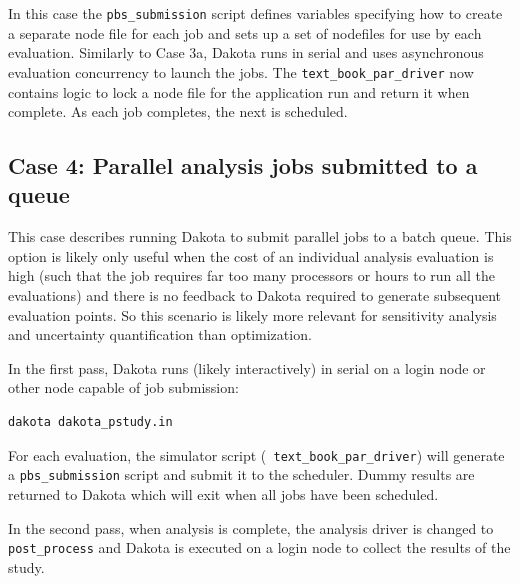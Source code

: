 In this case the {\tt pbs\_submission} script defines variables
specifying how to create a separate node file for each job and sets up
a set of nodefiles for use by each evaluation. Similarly to Case 3a,
Dakota runs in serial and uses asynchronous evaluation concurrency to
launch the jobs.  The {\tt text\_book\_par\_driver} now contains logic
to lock a node file for the application run and return it when
complete.  As each job completes, the next is scheduled.

\subsection{Case 4: Parallel analysis jobs submitted to a queue}

This case describes running Dakota to submit parallel jobs to a batch
queue.  This option is likely only useful when the cost of an
individual analysis evaluation is high (such that the job requires far
too many processors or hours to run all the evaluations) and there is
no feedback to Dakota required to generate subsequent evaluation
points.  So this scenario is likely more relevant for sensitivity
analysis and uncertainty quantification than optimization.

In the first pass, Dakota runs (likely interactively) in serial on a
login node or other node capable of job submission:
\begin{verbatim}
dakota dakota_pstudy.in
\end{verbatim}
For each evaluation, the simulator script ({\tt
text\_book\_par\_driver}) will generate a {\tt pbs\_submission} script
and submit it to the scheduler.  Dummy results are returned to Dakota
which will exit when all jobs have been scheduled.

In the second pass, when analysis is complete, the analysis driver is
changed to {\tt post\_process} and Dakota is executed on a login node
to collect the results of the study.

